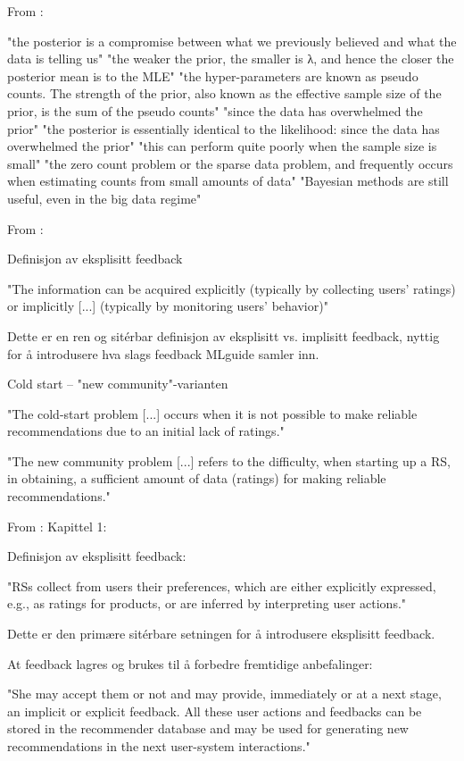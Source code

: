 From \parencite[Chapter~3.3]{murphy2012machine_learning_probabilistic_perspective}:

"the posterior is a compromise between what we previously believed and what the data is telling us"
"the weaker the prior, the smaller is λ, and hence the closer the posterior mean is to the MLE"
"the hyper-parameters are known as pseudo counts. The strength of the prior, also known as the effective sample size of the prior, is the sum of the pseudo counts"
"since the data has overwhelmed the prior"
"the posterior is essentially identical to the likelihood: since the data has overwhelmed the prior"
"this can perform quite poorly when the sample size is small"
"the zero count problem or the sparse data problem, and frequently occurs when estimating counts from small amounts of data"
"Bayesian methods are still useful, even in the big data regime"


From \parencite{bobadilla2013recommender_systems_survey}:


Definisjon av eksplisitt feedback

"The information can be acquired explicitly (typically by collecting users' ratings) or implicitly [...] (typically by monitoring users' behavior)"

Dette er en ren og sitérbar definisjon av eksplisitt vs. implisitt feedback, nyttig for å introdusere hva slags feedback MLguide samler inn.

Cold start – "new community"-varianten

"The cold-start problem [...] occurs when it is not possible to make reliable recommendations due to an initial lack of ratings."

"The new community problem [...] refers to the difficulty, when starting up a RS, in obtaining, a sufficient amount of data (ratings) for making reliable recommendations."

From \parencite[Chapter~1]{ricci2010recommender_systems_handbook} :
Kapittel 1:


Definisjon av eksplisitt feedback:

"RSs collect from users their preferences, which are either explicitly expressed, e.g., as ratings for products, or are inferred by interpreting user actions."

Dette er den primære sitérbare setningen for å introdusere eksplisitt feedback.

At feedback lagres og brukes til å forbedre fremtidige anbefalinger:

"She may accept them or not and may provide, immediately or at a next stage, an implicit or explicit feedback. All these user actions and feedbacks can be stored in the recommender database and may be used for generating new recommendations in the next user-system interactions."

